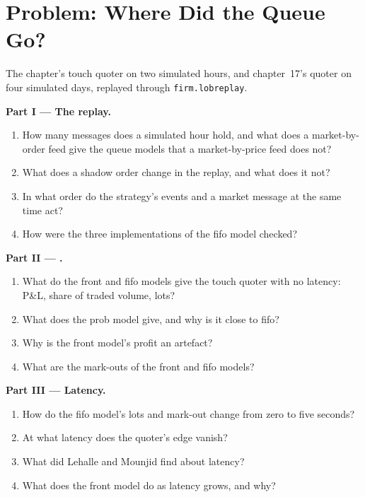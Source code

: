 \section{Problem: Where Did the Queue Go?}

\begin{problem}\label{pb:rs:order-book-replay-simulation:1}
The chapter's touch quoter on two simulated hours, and chapter~17's  quoter on four simulated days, replayed through \texttt{firm.lobreplay}.

\medskip\noindent\textbf{Part I --- The replay.}
\begin{enumerate}
\item How many messages does a simulated hour hold, and what does a market-by-order feed give the queue models that a market-by-price feed does not?
\item What does a shadow order change in the replay, and what does it not?
\item In what order do the strategy's events and a market message at the same time act?
\item How were the three implementations of the fifo model checked?
\end{enumerate}

\medskip\noindent\textbf{Part II --- .}
\begin{enumerate}[resume]
\item What do the front and fifo models give the touch quoter with no latency: P\&L, share of traded volume, lots?
\item What does the prob model give, and why is it close to fifo?
\item Why is the front model's profit an artefact?
\item What are the mark-outs of the front and fifo models?
\end{enumerate}

\medskip\noindent\textbf{Part III --- Latency.}
\begin{enumerate}[resume]
\item How do the fifo model's lots and mark-out change from zero to five seconds?
\item At what latency does the quoter's edge vanish?
\item What did Lehalle and Mounjid find about latency?
\item What does the front model do as latency grows, and why?
\end{enumerate}


\end{problem}
